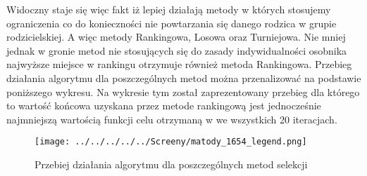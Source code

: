 \begin{itemize}
\begin{table}[h!]
\begin{center}
\caption{Ranking metod selekcji na podstawie średniej wartości funkcji celu}
\label{ranking_1}
\end{center}
\end{table}

Widoczny staje się więc fakt iż lepiej działają metody w których stosujemy ograniczenia co do konieczności nie powtarzania się danego rodzica w grupie rodzicielskiej. A więc metody Rankingowa, Losowa oraz Turniejowa. Nie mniej jednak w gronie metod nie stosujących się do zasady indywidualności osobnika najwyższe miejsce w rankingu otrzymuje również metoda Rankingowa. Przebieg działania algorytmu dla poszczególnych metod można przenalizować na podstawie poniższego wykresu. Na wykresie tym został zaprezentowany przebieg dla którego to wartość końcowa uzyskana przez metode rankingową jest jednocześnie najmniejszą wartością funkcji celu otrzymaną w we wszystkich 20 iteracjach.\\
\begin{figure}[ht]
		\texttt{[image: ../../../../../Screeny/matody\_1654\_legend.png]}
		\caption{Przebiej działania algorytmu dla poszczególnych metod selekcji}
		\label{ranking}			
\end{figure}


\end{itemize}
